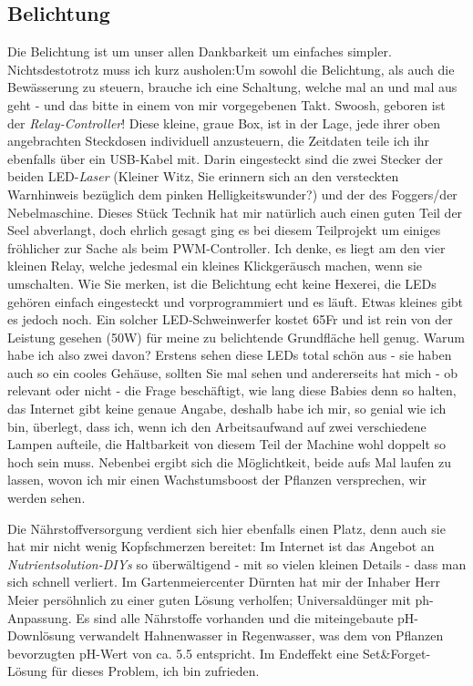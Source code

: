 \documentclass[12pt,titlepage,a4paper]{article}
\begin{document}
\subsection{Belichtung}
Die Belichtung ist um unser allen Dankbarkeit um einfaches simpler. Nichtsdestotrotz muss ich kurz ausholen:\n Um sowohl die Belichtung, als auch die Bewässerung zu steuern, brauche ich eine Schaltung, welche mal an und mal aus geht - und das bitte in einem von mir vorgegebenen Takt. Swoosh, geboren ist der \textit{Relay-Controller}! Diese kleine, graue Box, ist in der Lage, jede ihrer oben angebrachten Steckdosen individuell anzusteuern, die Zeitdaten teile ich ihr ebenfalls über ein USB-Kabel mit. Darin eingesteckt sind die zwei Stecker der beiden LED-\textit{Laser} (Kleiner Witz, Sie erinnern sich an den versteckten Warnhinweis bezüglich dem pinken Helligkeitswunder?) und der des Foggers/der Nebelmaschine. Dieses Stück Technik hat mir natürlich auch einen guten Teil der Seel abverlangt, doch ehrlich gesagt ging es bei diesem Teilprojekt um einiges fröhlicher zur Sache als beim PWM-Controller. Ich denke, es liegt am den vier kleinen Relay, welche jedesmal ein kleines Klickgeräusch machen, wenn sie umschalten.  \n Wie Sie merken, ist die Belichtung echt keine Hexerei, die LEDs gehören einfach eingesteckt und vorprogrammiert und es läuft. Etwas kleines gibt es jedoch noch. Ein solcher LED-Schweinwerfer kostet 65Fr und ist rein von der Leistung gesehen (50W) für meine zu belichtende Grundfläche hell genug. Warum habe ich also zwei davon? Erstens sehen diese LEDs total schön aus - sie haben auch so ein cooles Gehäuse, sollten Sie mal sehen und andererseits hat mich - ob relevant oder nicht - die Frage beschäftigt, wie lang diese Babies denn so halten, das Internet gibt keine genaue Angabe, deshalb habe ich mir, so genial wie ich bin, überlegt, dass ich, wenn ich den Arbeitsaufwand auf zwei verschiedene Lampen aufteile, die Haltbarkeit von diesem Teil der Machine wohl doppelt so hoch sein muss. Nebenbei ergibt sich die Möglichtkeit, beide aufs Mal laufen zu lassen, wovon ich mir einen Wachstumsboost der Pflanzen versprechen, wir werden sehen.











Die Nährstoffversorgung verdient sich hier ebenfalls einen Platz, denn auch sie hat mir nicht wenig Kopfschmerzen bereitet: Im Internet ist das Angebot an \textit{Nutrientsolution-DIYs} so überwältigend - mit so vielen kleinen Details - dass man sich schnell verliert. Im Gartenmeiercenter Dürnten hat mir der Inhaber Herr Meier persöhnlich zu einer guten Lösung verholfen; Universaldünger mit ph-Anpassung. Es sind alle Nährstoffe vorhanden und die miteingebaute pH-Downlösung verwandelt Hahnenwasser in Regenwasser, was dem von Pflanzen bevorzugten pH-Wert von ca. 5.5 entspricht. Im Endeffekt eine Set&Forget-Lösung für dieses Problem, ich bin zufrieden.
\end{document}
